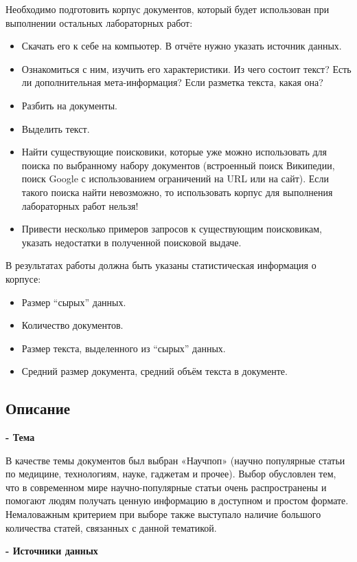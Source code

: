 \documentclass[pdf, unicode, 12pt, a4paper, oneside, fleqn]{article}
\begin{document}
Необходимо подготовить корпус документов, который будет использован при выполнении остальных лабораторных работ:
\begin{itemize}
    \item Скачать его к себе на компьютер. В отчёте нужно указать источник данных.
    \item Ознакомиться с ним, изучить его характеристики. Из чего состоит текст? Есть ли
дополнительная мета-информация? Если разметка текста, какая она?
    \item Разбить на документы.
    \item Выделить текст.
    \item Найти существующие поисковики, которые уже можно использовать для поиска по
выбранному набору документов (встроенный поиск Википедии, поиск Google с использованием ограничений на URL или на сайт). Если такого поиска найти невозможно, то использовать корпус для выполнения лабораторных работ нельзя!
    \item Привести несколько примеров запросов к существующим поисковикам, указать недостатки в полученной поисковой выдаче.
\end{itemize}

В результатах работы должна быть указаны статистическая информация о корпусе:
\begin{itemize}
    \item Размер \enquote{сырых} данных.
    \item Количество документов.
    \item Размер текста, выделенного из \enquote{сырых} данных.
    \item Средний размер документа, средний объём текста в документе.
\end{itemize}

\subsection*{Описание}

\textbf{- Тема}

В качестве темы документов был выбран «Научпоп» (научно
популярные статьи по медицине, технологиям, науке, гаджетам и прочее). Выбор обусловлен тем, что в современном мире научно-популярные статьи очень распространены и помогают людям получать ценную информацию в доступном и простом формате. Немаловажным критерием при выборе также выступало наличие большого количества статей, связанных с данной тематикой. 

\textbf{- Источники данных}
\end{document}
